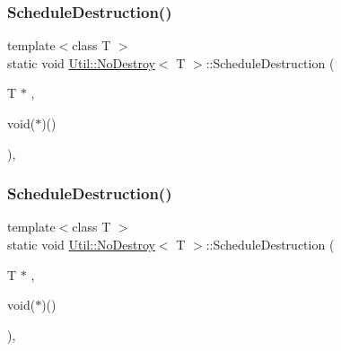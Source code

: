 \subsubsection{\texorpdfstring{ScheduleDestruction()}{ScheduleDestruction()}\hspace{0.1cm}{\footnotesize\ttfamily [1/3]}}
{\footnotesize\ttfamily template$<$class T $>$ \\
static void \mbox{\hyperlink{structUtil_1_1NoDestroy}{Util\+::\+No\+Destroy}}$<$ T $>$\+::Schedule\+Destruction (\begin{DoxyParamCaption}\item[{T $\ast$}]{,  }\item[{void($\ast$)()}]{ }\end{DoxyParamCaption})\hspace{0.3cm}{\ttfamily [inline]}, {\ttfamily [static]}}

\mbox{\label{structUtil_1_1NoDestroy_ae6d5e0f02676f06596f1280f22c9393d}} 
\subsubsection{\texorpdfstring{ScheduleDestruction()}{ScheduleDestruction()}\hspace{0.1cm}{\footnotesize\ttfamily [2/3]}}
{\footnotesize\ttfamily template$<$class T $>$ \\
static void \mbox{\hyperlink{structUtil_1_1NoDestroy}{Util\+::\+No\+Destroy}}$<$ T $>$\+::Schedule\+Destruction (\begin{DoxyParamCaption}\item[{T $\ast$}]{,  }\item[{void($\ast$)()}]{ }\end{DoxyParamCaption})\hspace{0.3cm}{\ttfamily [inline]}, {\ttfamily [static]}}

\mbox{\label{structUtil_1_1NoDestroy_ae6d5e0f02676f06596f1280f22c9393d}} 
